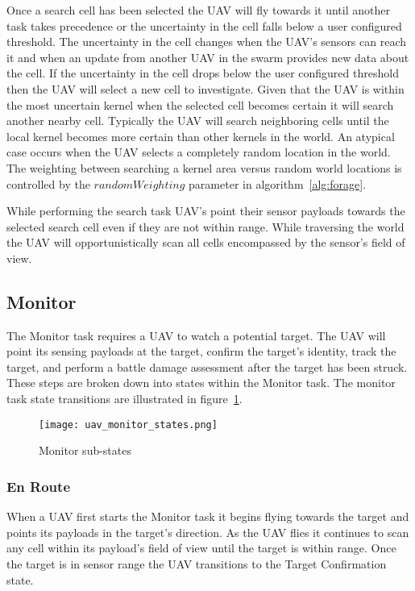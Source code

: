 Once a search cell has been selected the UAV will fly towards it until another task takes precedence or the uncertainty in the cell falls below a user configured threshold.  The uncertainty in the cell changes when the UAV's sensors can reach it and when an update from another UAV in the swarm provides new data about the cell. If the uncertainty in the cell drops below the user configured threshold then the UAV will select a new cell to investigate.  Given that the UAV is within the most uncertain kernel when the selected cell becomes certain it will search another nearby cell.  Typically the UAV will search neighboring cells until the local kernel becomes more certain than other kernels in the world.  An atypical case occurs when the UAV selects a completely random location in the world.  The weighting between searching a kernel area versus random world locations is controlled by the $randomWeighting$ parameter in algorithm~\ref{alg:forage}.

While performing the search task UAV's point their sensor payloads towards the selected search cell even if they are not within range.  While traversing the world the UAV will opportunistically scan all cells encompassed by the sensor's field of view.


\subsection{Monitor}
The Monitor task requires a UAV to watch a potential target.  The UAV will point its sensing payloads at the target, confirm the target's identity, track the target, and perform a battle damage assessment after the target has been struck.  These steps are broken down into states within the Monitor task.  The monitor task state transitions are illustrated in figure~\ref{fig:monitor}.  

\begin{figure}[p]
	\centering
	\texttt{[image: uav\_monitor\_states.png]}
	\caption{Monitor sub-states}
	\label{fig:monitor}
\end{figure}

\subsubsection{En Route}
When a UAV first starts the Monitor task it begins flying towards the target and points its payloads in the target's direction.  As the UAV flies it continues to scan any cell within its payload's field of view until the target is within range.  Once the target is in sensor range the UAV transitions to the Target Confirmation state.  

